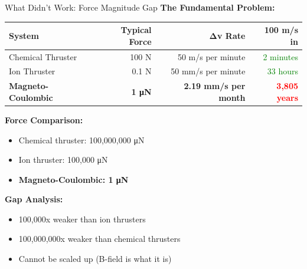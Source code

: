 \documentclass[aspectratio=169]{beamer}
\begin{document}
\begin{frame}{What Didn't Work: Force Magnitude Gap}
\textbf{The Fundamental Problem:}

\vspace{0.5em}
\begin{table}
\begin{tabular}{lrrr}
\toprule
\textbf{System} & \textbf{Typical Force} & \textbf{Δv Rate} & \textbf{100 m/s in} \\
\midrule
Chemical Thruster & 100 N & 50 m/s per minute & \textcolor{green}{2 minutes} \\
Ion Thruster & 0.1 N & 50 mm/s per minute & \textcolor{green}{33 hours} \\
\textbf{Magneto-Coulombic} & \textbf{1 μN} & \textbf{2.19 mm/s per month} & \textcolor{red}{\textbf{3,805 years}} \\
\bottomrule
\end{tabular}
\end{table}

\vspace{1em}
\textbf{Force Comparison:}
\begin{itemize}
    \item Chemical thruster: 100,000,000 μN
    \item Ion thruster: 100,000 μN
    \item \textbf{Magneto-Coulombic: 1 μN}
\end{itemize}

\vspace{0.5em}
\textbf{Gap Analysis:}
\begin{itemize}
    \item 100,000x weaker than ion thrusters
    \item 100,000,000x weaker than chemical thrusters
    \item Cannot be scaled up (B-field is what it is)
\end{itemize}
\end{frame}
\end{document}
